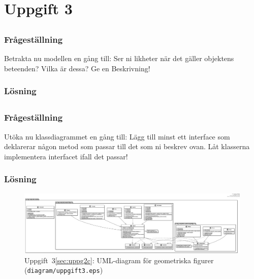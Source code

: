 %
%
%

\section{Uppgift 3}\label{sec:uppg3}

\subsection{}\label{sec:uppg3a}
\subsubsection*{Frågeställning}
Betrakta nu modellen en gång till: Ser ni likheter när det gäller objektens
beteenden? Vilka är dessa? Ge en Beskrivning!

\subsubsection*{Lösning}



\subsection{}\label{sec:uppg3b}
\subsubsection*{Frågeställning}
Utöka nu klassdiagrammet en gång till: Lägg till minst ett interface som
deklarerar någon metod som passar till det som ni beskrev ovan. Låt klasserna
implementera interfacet ifall det passar!

\subsubsection*{Lösning}

\begin{figure}
\centering
\includegraphics[width=\linewidth]{diagram/uppgift3.eps}
\caption{Uppgift~3\ref{sec:uppg2c}: UML-diagram för geometriska figurer
(\texttt{diagram/uppgift3.eps})}
\label{fig:uppg3a}
\end{figure}



